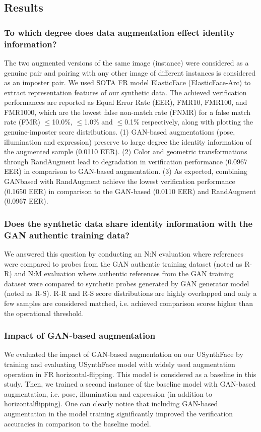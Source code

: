 \documentclass[12pt]{article}
\begin{document}
\subsection{Results}
\subsubsection{ To which degree does data augmentation effect identity
information?}
The two augmented versions of
the same image (instance) were considered as a genuine pair
and pairing with any other image of different instances is
considered as an imposter pair. We used SOTA FR model
ElasticFace (ElasticFace-Arc) to extract representation
features of our synthetic data. The achieved verification
performances are reported as Equal Error Rate (EER),
FMR10, FMR100, and FMR1000, which are the lowest
false non-match rate (FNMR) for a false match rate (FMR)
$\leq$10.0\%, $\leq$1.0\% and $\leq$0.1\% respectively, along with plotting the genuine-imposter score distributions. (1) GAN-based augmentations (pose,
illumination and expression) preserve to large degree the
identity information of the augmented sample (0.0110 EER). (2) Color and geometric
transformations through RandAugment lead to degradation
in verification performance (0.0967 EER) in comparison to
GAN-based augmentation. (3) As expected, combining GANbased with RandAugment achieve the lowest verification
performance (0.1650 EER) in comparison to the GAN-based
(0.0110 EER) and RandAugment (0.0967 EER).
\subsubsection{Does the synthetic data share identity information with
the GAN authentic training data?}
We answered this question
by conducting an N:N evaluation where references were
compared to probes from the GAN authentic training dataset
(noted as R-R) and N:M evaluation where authentic references from the GAN training dataset were compared
to synthetic probes generated by GAN generator model
(noted as R-S). R-R and R-S score distributions are highly overlapped and
only a few samples are considered matched, i.e. achieved
comparison scores higher than the operational threshold.
\subsubsection{Impact of GAN-based augmentation}
We evaluated the impact of GAN-based augmentation
on our USynthFace by training and evaluating USynthFace
model with widely used augmentation operation in FR horizontal-flipping. This model is considered
as a baseline in this study. Then, we trained a second instance
of the baseline model with GAN-based augmentation, i.e.
pose, illumination and expression (in addition to horizontalflipping). One can clearly notice that including GAN-based augmentation in the model training significantly improved the
verification accuracies in comparison to the baseline model.
\end{document}
